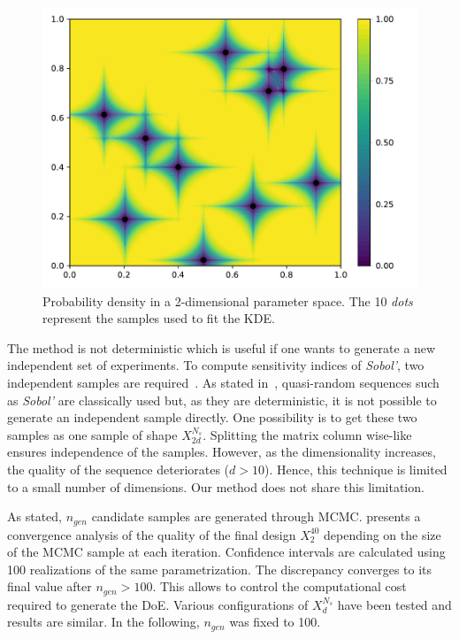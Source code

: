 \begin{figure}[!ht]
\centering
\includegraphics[width=0.8\linewidth,keepaspectratio]{fig/contributions/doe/10_star.pdf}
\caption{Probability density in a 2-dimensional parameter space. The 10 \emph{dots} represent the samples used to fit the KDE.}
\label{fig:star}
\end{figure}

The method is not deterministic which is useful if one wants to generate a new independent set of experiments. To compute sensitivity indices of \emph{Sobol'}, two independent samples are required~\citep{Saltelli2010}. As stated in~\citep{Saltelli2010}, quasi-random sequences such as \emph{Sobol'} are classically used but, as they are deterministic, it is not possible to generate an independent sample directly. One possibility is to get these two samples as one sample of shape $X_{2d}^{N_s}$. Splitting the matrix column wise-like ensures independence of the samples. However, as the dimensionality increases, the quality of the sequence deteriorates ($d > 10$). Hence, this technique is limited to a small number of dimensions. Our method does not share this limitation.

As stated, $n_{gen}$ candidate samples are generated through MCMC.  presents a convergence analysis of the quality of the final design $X_2^{40}$ depending on the size of the MCMC sample at each iteration. Confidence intervals are calculated using 100 realizations of the same parametrization. The discrepancy converges to its final value after $n_{gen}>100$. This allows to control the computational cost required to generate the DoE. Various configurations of $X_d^{N_s}$ have been tested and results are similar. In the following, $n_{gen}$ was fixed to 100.

